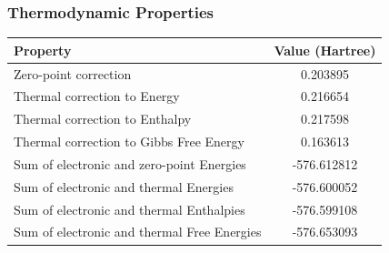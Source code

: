\documentclass[aspectratio=169, 9pt]{beamer}
\begin{document}
\begin{frame}
\frametitle{Thermodynamic Properties}
\begin{center}
\begin{tabular}{|l|c|}
\hline
\textbf{Property} & \textbf{Value (Hartree)} \\
\hline
Zero-point correction & 0.203895 \\
\hline
Thermal correction to Energy & 0.216654 \\
\hline
Thermal correction to Enthalpy & 0.217598 \\
\hline
Thermal correction to Gibbs Free Energy & 0.163613 \\
\hline
Sum of electronic and zero-point Energies & -576.612812 \\
\hline
Sum of electronic and thermal Energies & -576.600052 \\
\hline
Sum of electronic and thermal Enthalpies & -576.599108 \\
\hline
Sum of electronic and thermal Free Energies & -576.653093 \\
\hline
\end{tabular}
\end{center}
\end{frame}
\end{document}
